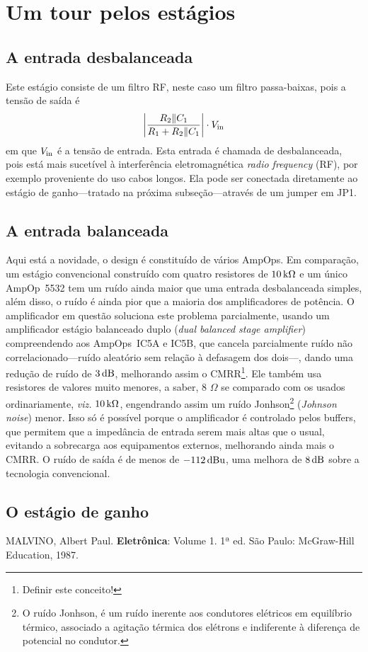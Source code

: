 \documentclass[12pt, a4paper, leqno, twoside]{book}
\def\ohm{\,\Omega}
\def\ampop{AmpOp}
\def\db{{\rm dB}}
\begin{document}
  \section{Um tour pelos est\'agios}
  \subsection{A entrada desbalanceada}

  Este est\'agio consiste de um filtro RF, neste caso um filtro passa-baixas, pois a tens\~ao de sa\'ida \'e 
  \begin{equation}
    \bigg|{R_2\|C_1\over R_1+R_2\|C_1}\bigg|\cdot V_{\rm in}
  \end{equation}
  em que $V_{\rm in}$ \'e a tens\~ao de entrada. Esta entrada \'e chamada de desbalanceada, pois est\'a mais sucet\'ivel \`a interfer\^encia eletromagn\'etica {\it radio frequency} (RF), por exemplo proveniente do uso cabos longos. Ela pode ser conectada diretamente ao est\'agio de ganho---tratado na pr\'oxima subse\c c\~ao---atrav\'es de um jumper em JP1. 

  \subsection{A entrada balanceada}
  Aqui est\'a a novidade, o design \'e constitu\'ido de v\'arios \ampop{s}. Em compara\c c\~ao, um est\'agio convencional constru\'ido com quatro resistores de $10\,{\rm k}\Omega$ e um \'unico \ampop\ 5532 tem um ru\'ido ainda maior que uma entrada desbalanceada simples, al\'em disso, o ru\'ido \'e ainda pior que a maioria dos amplificadores de pot\^encia. O amplificador em quest\~ao soluciona este problema parcialmente, usando um amplificador est\'agio balanceado duplo ({\it dual balanced stage amplifier}) compreendendo aos \ampop{s}\ IC5A e IC5B, que cancela parcialmente ru\'ido n\~ao correlacionado---ru\'ido aleat\'orio sem rela\c c\~ao \`a defasagem dos dois---, dando uma redu\c c\~ao de ru\'ido de $3\,\db$, melhorando assim o CMRR\footnote{Definir este conceito!}. Ele tamb\'em usa resistores de valores muito menores, a saber, $8\,\ohm$ se comparado com os usados ordinariamente, {\it viz.} $10\,{\rm k}\Omega$, engendrando assim um ru\'ido Jonhson\footnote{O ru\'ido Jonhson, \'e um ru\'ido inerente aos condutores el\'etricos em equil\'ibrio t\'ermico, associado a agita\c c\~ao t\'ermica dos el\'etrons e indiferente \`a diferen\c ca de potencial no condutor.} ({\it Johnson noise}) menor. Isso s\'o \'e poss\'ivel porque o amplificador \'e controlado pelos buffers, que permitem que a imped\^ancia de entrada serem mais altas que o usual, evitando a sobrecarga aos equipamentos externos, melhorando ainda mais o CMRR. O ru\'ido de sa\'ida \'e de menos de $-112\,\db{\rm u}$, uma melhora de $8\,\db$ sobre a tecnologia convencional.
  \subsection{O est\'agio de ganho}

  \begin{thebibliography}{}
    MALVINO, Albert Paul. {\bf Eletr\^onica\/}: Volume 1. 1ª ed. S\~ao Paulo: McGraw-Hill Education, 1987.
  \end{thebibliography}
\end{document}
